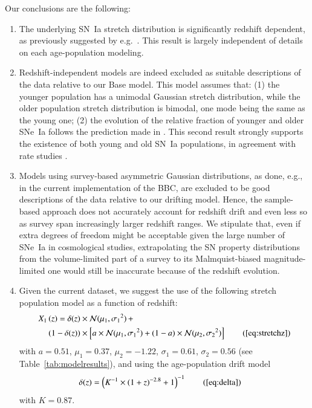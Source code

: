 \documentclass[]{aa}
\begin{document}
Our conclusions are the following:
\begin{enumerate}
    \item The underlying SN~Ia stretch distribution is significantly redshift
        dependent, as previously suggested by e.g.~\cite{howell2007}. This
        result is largely independent of details on each age-population
        modeling.
    
    \item Redshift-independent models are indeed excluded as suitable
        descriptions of the data relative to our Base model. This model assumes
        that: (1) the younger population has a unimodal Gaussian stretch
        distribution, while the older population stretch distribution is
        bimodal, one mode being the same as the young one; (2) the evolution of
        the relative fraction of younger and older SNe~Ia follows the prediction
        made in \cite{rigault2018}. This second result strongly supports the
        existence of both young and old SN~Ia populations, in agreement with
        rate studies \cite{mannucci2005, scannapieco2005, sullivan2006,
        aubourg2008}. 
        
    \item Models using survey-based asymmetric Gaussian distributions, as done,
        e.g., in the current implementation of the BBC, are excluded to be good
        descriptions of the data relative to our drifting model. Hence, the
        sample-based approach does not accurately account for redshift drift and
        even less so as survey span increasingly larger redshift ranges. We
        stipulate that, even if extra degrees of freedom might be acceptable
        given the large number of SNe~Ia in cosmological studies, extrapolating
        the SN property distributions from the volume-limited part of a survey
        to its Malmquist-biased magnitude-limited one  would still be inaccurate
        because of the redshift evolution.

    \item Given the current dataset, we suggest the use of the following stretch
        population model as a function of redshift:
        \begin{align*}
        \label{eqconclusion:stretchz}
            X_1\left(z \right) =
            \delta(z)&\times\mathcal{N}(\mu_1,\sigma_1{}^2)\,+\nonumber\\
            (1-\delta(z))&\times \left[a\times\mathcal{N}(\mu_1,\sigma_1{}^2) +
            (1-a)\times\mathcal{N}(\mu_2,\sigma_2{}^2)\right]
            \tag{\ref{eq:stretchz}}
        \end{align*}
        with $a=0.51$, $\mu_1=0.37$, $\mu_2=-1.22$, $\sigma_1=0.61$,
        $\sigma_2=0.56$ (see Table~\ref{tab:modelresults}), and using the
        age-population drift model         \begin{align*}
            \delta(z) & = \left( K^{-1} \times (1+z)^{-2.8} +1 \right)^{-1}
            \tag{\ref{eq:delta}}
        \end{align*}
        with $K=0.87$.
\end{enumerate}
\end{document}
